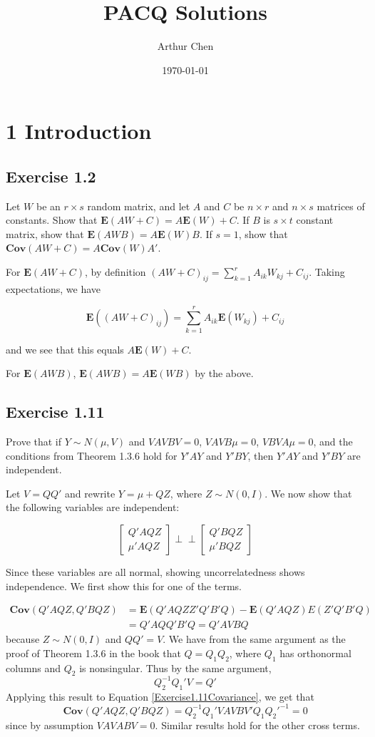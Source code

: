 \documentclass{article}
\author{Arthur Chen}
\title{PACQ Solutions}
\date{\today}
\newcommand{\indep}{\perp \!\!\! \perp}
\newcommand{\E}{\boldsymbol{E}}
\newcommand{\cov}{\boldsymbol{Cov}}
\begin{document}
\maketitle

\section*{1 Introduction}

\subsection*{Exercise 1.2}

Let $W$ be an $r \times s$ random matrix, and let $A$ and $C$ be $n \times r$ and $n \times s$ matrices of constants. Show that $\E(AW+C) = A\E(W) + C$. If $B$ is $s \times t$ constant matrix, show that $\E(AWB) = A\E(W)B$. If $s=1$, show that $\cov(AW+C) = A\cov(W)A'$.

For $\E(AW+C)$, by definition $(AW+C)_{ij} = \sum_{k=1}^r A_{ik}W_{kj} + C_{ij}$. Taking expectations, we have

\[
\E((AW+C)_{ij}) = \sum_{k=1}^r A_{ik}\E(W_{kj}) + C_{ij}
\]

and we see that this equals $A\E(W)+C$.

For $\E(AWB)$, $\E(AWB) = A\E(WB)$ by the above.

\subsection*{Exercise 1.11}

Prove that if $Y \sim N(\mu, V)$ and $VAVBV=0$, $VAVB\mu=0$, $VBVA\mu=0$, and the conditions from Theorem 1.3.6 hold for $Y'AY$ and $Y'BY$, then $Y'AY$ and $Y'BY$ are independent.

Let $V=QQ'$ and rewrite $Y=\mu + QZ$, where $Z\sim N(0,I)$. We now show that the following variables are independent:

\begin{equation}
\begin{bmatrix}
Q'AQZ \\
\mu'AQZ
\end{bmatrix}
\indep
\begin{bmatrix}
Q'BQZ \\
\mu'BQZ
\end{bmatrix}
\end{equation}

Since these variables are all normal, showing uncorrelatedness shows independence. We first show this for one of the terms.

\begin{align}
\label{Exercise1.11Covariance}
\cov(Q'AQZ, Q'BQZ) &= \E(Q'AQZZ'Q'B'Q) - \E(Q'AQZ)E(Z'Q'B'Q) \\
&= Q'AQQ'B'Q = Q'AVBQ
\end{align}
because $Z \sim N(0, I)$ and $QQ' = V$. We have from the same argument as the proof of Theorem 1.3.6 in the book that $Q = Q_1Q_2$, where $Q_1$ has orthonormal columns and $Q_2$ is nonsingular. Thus by the same argument,
\[
Q_2^{-1}Q_1'V = Q'
\]
Applying this result to Equation \ref{Exercise1.11Covariance}, we get that
\[
\cov(Q'AQZ, Q'BQZ)=Q_2^{-1}Q_1'VAVBV'Q_1Q_2'^{-1} = 0
\]
since by assumption $VAVABV=0$. Similar results hold for the other cross terms.
\end{document}

